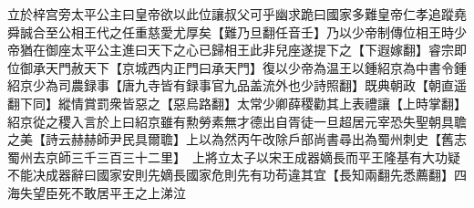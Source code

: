 立於梓宫旁太平公主曰皇帝欲以此位讓叔父可乎幽求跪曰國家多難皇帝仁孝追蹤堯舜誠合至公相王代之任重慈愛尤厚矣【難乃旦翻任音壬】乃以少帝制傳位相王時少帝猶在御座太平公主進曰天下之心已歸相王此非兒座遂提下之【下遐嫁翻】睿宗即位御承天門赦天下【京城西内正門曰承天門】復以少帝為温王以鍾紹京為中書令鍾紹京少為司農録事【唐九寺皆有録事官九品盖流外也少詩照翻】既典朝政【朝直遥翻下同】縱情賞罰衆皆惡之【惡烏路翻】太常少卿薛稷勸其上表禮讓【上時掌翻】紹京從之稷入言於上曰紹京雖有勲勞素無才德出自胥徒一旦超居元宰恐失聖朝具聸之美【詩云赫赫師尹民具爾聸】上以為然丙午改除戶部尚書尋出為蜀州刺史【舊志蜀州去京師三千三百三十二里】　上將立太子以宋王成器嫡長而平王隆基有大功疑不能决成器辭曰國家安則先嫡長國家危則先有功苟違其宜【長知兩翻先悉薦翻】四海失望臣死不敢居平王之上涕泣